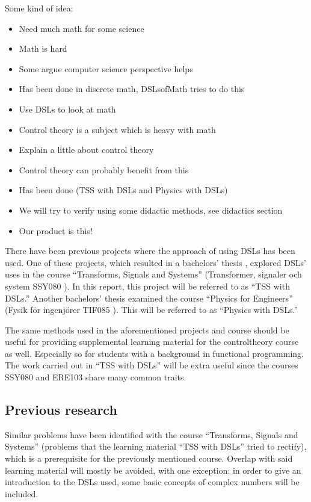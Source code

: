 
\iffalse
Some kind of idea:
\begin{itemize}
    \item Need much math for some science
    \item Math is hard
    \item Some argue computer science perspective helps 
    \item Has been done in discrete math, DSLsofMath tries to do this %
    \item Use DSLs to look at math
    \item Control theory is a subject which is heavy with math
    \item Explain a little about control theory
    \item Control theory can probably benefit from this
    \item Has been done (TSS with DSLs and Physics with DSLs)
    \item We will try to verify using some didactic methods, see didactics section
    \item Our product is this!
\end{itemize}

There have been previous projects where the approach of using \gls{DSL}s has been used. One of these projects, which resulted in a bachelors' thesis \cite{tssarbete}, explored \gls{DSL}s' uses in the course ``Transforms, Signals and Systems'' (Transformer, signaler och system \gls{SSY080} \cite{SSY080}). In this report, this project will be referred to as ``TSS with DSLs.''
Another bachelors' thesis \cite{fysikarbete} examined the course ``Physics for Engineers'' (Fysik för ingenjörer \gls{TIF085} \cite{TIF085}). This will be referred to as ``Physics with DSLs.''

The same methods used in the aforementioned projects and course should be useful for providing supplemental learning material for the \gls{controltheory} course as well. Especially so for students with a background in functional programming. The work carried out in ``TSS with DSLs'' will be extra useful since the courses \gls{SSY080} and \gls{ERE103} share many common traits.

\subsection{Previous research}
Similar problems have been identified with the course ``Transforms, Signals and Systems'' (problems that the learning material ``TSS with DSLs'' \cite{tssarbete} tried to rectify), which is a prerequisite for the previously mentioned course. Overlap with said learning material will mostly be avoided, with one exception: in order to give an introduction to the \gls{DSL}s used, some basic concepts of complex numbers will be included. 

